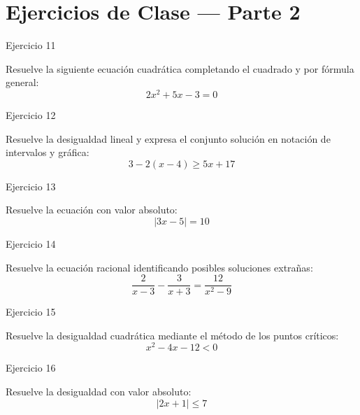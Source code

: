 \documentclass[aspectratio=169]{beamer}
\begin{document}
\section{Ejercicios de Clase — Parte 2}

\begin{frame}{Ejercicio 11}
  \begin{mwejercicio}
    Resuelve la siguiente ecuación cuadrática completando el cuadrado y por fórmula general:
    $$2x^2 + 5x - 3 = 0$$
  \end{mwejercicio}
  \vspace{3.5cm}
\end{frame}
\begin{frame}{Ejercicio 12}
  \begin{mwejercicio}
    Resuelve la desigualdad lineal y expresa el conjunto solución en notación de intervalos y gráfica:
    $$3 - 2(x - 4) \ge 5x + 17$$
  \end{mwejercicio}
  \vspace{3.5cm}
\end{frame}
\begin{frame}{Ejercicio 13}
  \begin{mwejercicio}
    Resuelve la ecuación con valor absoluto:
    $$|3x - 5| = 10$$
  \end{mwejercicio}
  \vspace{3.5cm}
\end{frame}
\begin{frame}{Ejercicio 14}
  \begin{mwejercicio}
    Resuelve la ecuación racional identificando posibles soluciones extrañas:
    $$\frac{2}{x - 3} - \frac{3}{x + 3} = \frac{12}{x^2 - 9}$$
  \end{mwejercicio}
  \vspace{3.5cm}
\end{frame}
\begin{frame}{Ejercicio 15}
  \begin{mwejercicio}
    Resuelve la desigualdad cuadrática mediante el método de los puntos críticos:
    $$x^2 - 4x - 12 < 0$$
  \end{mwejercicio}
  \vspace{3.5cm}
\end{frame}
\begin{frame}{Ejercicio 16}
  \begin{mwejercicio}
    Resuelve la desigualdad con valor absoluto:
    $$|2x + 1| \le 7$$
  \end{mwejercicio}
  \vspace{3.5cm}
\end{frame}
\end{document}
